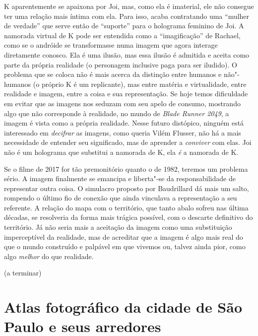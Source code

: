 K aparentemente se apaixona por Joi, mas, como ela é imaterial, ele não
consegue ter uma relação mais íntima com ela. Para isso, acaba
contratando uma ``mulher de verdade'' que serve então de ``suporte''
para o holograma feminino de Joi. A namorada virtual de K pode ser
entendida como a ``imagificação'' de Rachael, como se o andróide se
transformasse numa imagem que agora interage diretamente conosco. Ela é
uma ilusão, mas essa ilusão é admitida e aceita como parte da própria
realidade (o personagem inclusive paga para ser iludido). O problema que
se coloca não é mais acerca da distinção entre humanos e não"-humanos (o
próprio K é um replicante), mas entre matéria e virtualidade, entre
realidade e imagem, entre a coisa e sua representação. Se hoje temos
dificuldade em evitar que as imagens nos seduzam com seu apelo de
consumo, mostrando algo que não corresponde à realidade, no mundo de
\emph{Blade Runner 2049}, a imagem é vista como a própria realidade.
Nesse futuro distópico, ninguém está interessado em \emph{decifrar} as
imagens, como queria Vilém Flusser, não há a mais necessidade de
entender seu significado, mas de aprender a \emph{conviver} com elas.
Joi não é um holograma que substitui a namorada de K, ela \emph{é} a
namorada de K.

Se o filme de 2017 for tão premonitório quanto o de 1982, teremos um
problema sério. A imagem finalmente se emancipa e liberta"-se da
responsabilidade de representar outra coisa. O simulacro proposto por
Baudrillard dá mais um salto, rompendo o último fio de conexão que ainda
vinculava a representação a seu referente. A relação do mapa com o
território, que tanto abalo sofreu nas última décadas, se resolveria da
forma mais trágica possível, com o descarte definitivo do território. Já
não seria mais a aceitação da imagem como uma substituição imperceptível
da realidade, mas de acreditar que a imagem é algo mais real do que o
mundo construído e palpável em que vivemos ou, talvez ainda pior, como
algo \emph{melhor} do que realidade.

(a terminar)

\chapter*{Atlas fotográfico da cidade de São Paulo e seus arredores}

